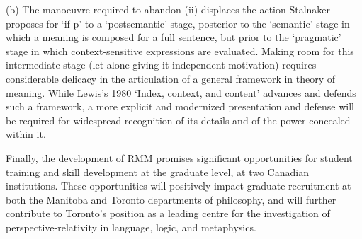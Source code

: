 (b) The manoeuvre required to abandon (ii) displaces the action Stalnaker
proposes for ‘if p’ to a ‘postsemantic’ stage, posterior to the ‘semantic’
stage in which a meaning is composed for a full sentence, but prior to the
‘pragmatic’ stage in which context-sensitive expressions are evaluated. Making
room for this intermediate stage (let alone giving it independent motivation)
requires considerable delicacy in the articulation of a general framework in
theory of meaning. While Lewis’s 1980 ‘Index, context, and content’ advances
and defends such a framework, a more explicit and modernized presentation and
defense will be required for widespread recognition of its details and of the
power concealed within it.

Finally, the development of RMM promises significant opportunities for student training
and skill development at the graduate level, at two Canadian institutions.
These opportunities will positively impact graduate recruitment at both the
Manitoba and Toronto departments of philosophy, and will further contribute to
Toronto's position as a leading centre for the investigation of
perspective-relativity in language, logic, and metaphysics. 


